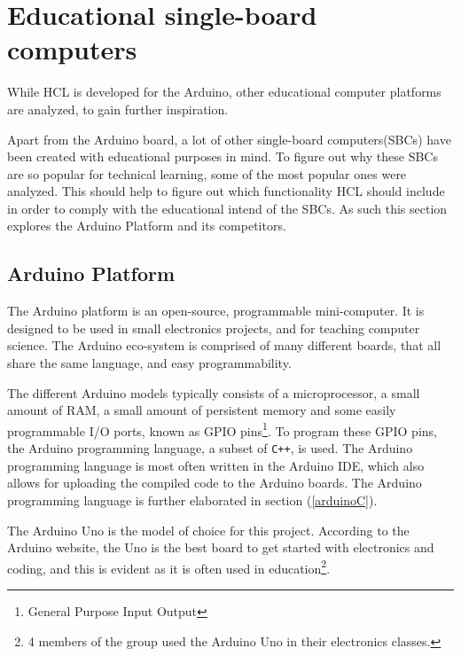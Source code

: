 
\section{Educational single-board computers}
While HCL is developed for the Arduino, other educational computer platforms are analyzed, to gain further inspiration.

Apart from the Arduino board, a lot of other single-board computers(SBCs) have been created with educational purposes in mind.
To figure out why these SBCs are so popular for technical learning, some of the most popular ones were analyzed.
This should help to figure out which functionality HCL should include in order to comply with the educational intend of the SBCs\cite{SBC}.
As such this section explores the Arduino Platform and its competitors.

\subsection{Arduino Platform}
The Arduino platform is an open-source, programmable mini-computer\cite{ArFAQ}.
It is designed to be used in small electronics projects, and for teaching computer science.
The Arduino eco-system is comprised of many different boards, that all share the same language, and easy programmability.

The different Arduino models typically consists of a microprocessor, a small amount of RAM, a small amount of persistent memory and some easily programmable I/O ports, known as GPIO pins\footnote{General Purpose Input Output}.
To program these GPIO pins, the Arduino programming language, a subset of \texttt{C++}, is used.
The Arduino programming language is most often written in the Arduino IDE, which also allows for uploading the compiled code to the Arduino boards.
The Arduino programming language is further elaborated in section (\ref{arduinoC}).

The Arduino Uno is the model of choice for this project.
According to the Arduino website, the Uno is the best board to get started with electronics and coding, and this is evident as it is often used in education\footnote{4 members of the group used the Arduino Uno in their electronics classes.}\cite{ArduinoUno}.

